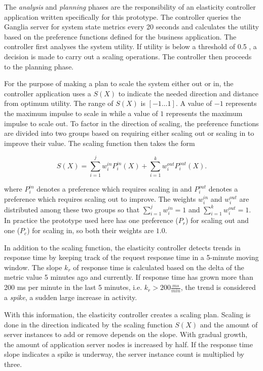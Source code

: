 \documentclass[english]{tktltiki2}
\theoremstyle{definition}
\theoremstyle{remark}
\begin{document}
The \textit{analysis} and \textit{planning} phases are the responsibility of an
elasticity controller application written specifically for this prototype. The
controller queries the Ganglia server for system state metrics every 20 seconds
and calculates the utility based on the preference functions defined for the
business application. The controller first analyses the system utility. If
utility is below a threshold of 0.5 , a decision is made to carry out a scaling operations. The
controller then proceeds to the planning phase.

For the purpose of making a plan to scale the system either out or in, the
controller application uses a  $S(X)$ to indicate the
needed direction and distance from optimum utility. The range of $S(X)$ is
$[-1\dots1]$. A value of $-1$ represents the maximum impulse to scale in while a
value of $1$ represents the maximum impulse to scale out. To factor in the
direction of scaling, the preference functions are divided into two groups based
on requiring either scaling out or scaling in to improve their value.  The
scaling function then takes the form

\begin{equation}
S(X) = \sum\limits_{i=1}^j w_{i}^{in}P_{i}^{in}(X) + 
		\sum\limits_{i=1}^k w_{i}^{out}P_{i}^{out}(X).
\label{eq:scalingfunction}
\end{equation}

where $P_{i}^{in}$ denotes a preference which requires scaling in and
$P_{i}^{out}$ denotes a preference which requires scaling out to improve. The
weights $w_{i}^{in}$ and $w_{i}^{out}$ are distributed among these two groups so
that $\sum\limits_{i=1}^j w_{i}^{in} = 1$ and $\sum\limits_{i=1}^k w_{i}^{out} =
1$. In practice the prototype used here has one preference ($P_{r}$) for scaling out and one ($P_{c}$) for scaling in, so both their weights are $1.0$.

In addition to the scaling function, the elasticity controller detects trends in
response time by keeping track of the request response time in a 5-minute moving
window. The slope $k_{r}$ of response time is calculated based on the delta of
the metric value 5 minutes ago and currently. If response time has grown more
than 200 ms per minute in the last 5 minutes, i.e. $k_{r} > 200 \frac{ms}{min}$,
the trend is considered a \textit{spike}, a sudden large increase in activity.

With this information, the elasticity controller creates a scaling plan. Scaling
is done in the direction indicated by the scaling function $S(X)$ and the amount
of server instances to add or remove depends on the slope. With gradual growth,
the amount of application server nodes is increased by half. If the response
time slope indicates a spike is underway, the server instance count is
multiplied by three.
\end{document}
